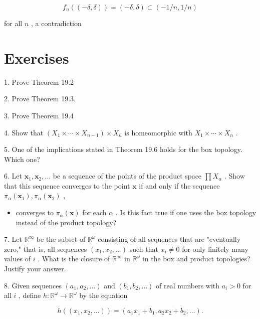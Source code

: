 \[
{f}_{n}\left( \left( {-\delta ,\delta }\right) \right)  = \left( {-\delta ,\delta }\right)  \subset  \left( {-1/n,1/n}\right)
\]

for all \(n\) , a contradiction

\section*{Exercises}

1. Prove Theorem 19.2

2. Prove Theorem 19.3.

3. Prove Theorem 19.4

4. Show that \(\left( {{X}_{1} \times  \cdots  \times  {X}_{n - 1}}\right)  \times  {X}_{n}\) is homeomorphic with \({X}_{1} \times  \cdots  \times  {X}_{n}\) .

5. One of the implications stated in Theorem 19.6 holds for the box topology. Which one?

6. Let \({\mathbf{x}}_{1},{\mathbf{x}}_{2},\ldots\) be a sequence of the points of the product space \(\prod {X}_{\alpha }\) . Show that this sequence converges to the point \(\mathbf{x}\) if and only if the sequence \({\pi }_{\alpha }\left( {\mathbf{x}}_{1}\right) ,{\pi }_{\alpha }\left( {\mathbf{x}}_{2}\right)\) ,

\begin{itemize}
\item converges to \({\pi }_{\alpha }\left( \mathbf{x}\right)\) for each \(\alpha\) . Is this fact true if one uses the box topology instead of the product topology?
\end{itemize}

7. Let \({\mathbb{R}}^{\infty }\) be the subset of \({\mathbb{R}}^{\omega }\) consisting of all sequences that are "eventually zero," that is, all sequences \(\left( {{x}_{1},{x}_{2},\ldots }\right)\) such that \({x}_{i} \neq  0\) for only finitely many values of \(i\) . What is the closure of \({\mathbb{R}}^{\infty }\) in \({\mathbb{R}}^{\omega }\) in the box and product topologies? Justify your answer.

8. Given sequences \(\left( {{a}_{1},{a}_{2},\ldots }\right)\) and \(\left( {{b}_{1},{b}_{2},\ldots }\right)\) of real numbers with \({a}_{i} > 0\) for all \(i\) , define \(h : {\mathbb{R}}^{\omega } \rightarrow  {\mathbb{R}}^{\omega }\) by the equation

\[
h\left( \left( {{x}_{1},{x}_{2},\ldots }\right) \right)  = \left( {{a}_{1}{x}_{1} + {b}_{1},{a}_{2}{x}_{2} + {b}_{2},\ldots }\right) .
\]

